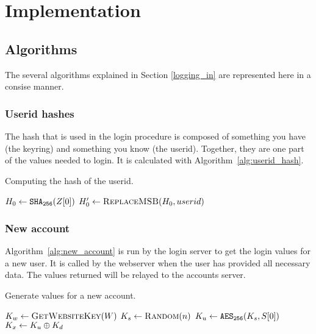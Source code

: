 \clearpage
\section{Implementation}

\subsection{Algorithms}
The several algorithms explained in Section \ref{logging_in} are represented here in a consise manner.
\subsubsection{Userid hashes}
The hash that is used in the login procedure is composed of something you have
(the keyring)
and something you know
(the userid).
Together,
they are one part of the values needed to login.
It is calculated with Algorithm~\vref{alg:userid_hash}.
\begin{algorithm}
\caption{Computing the hash of the userid.}
\label{alg:userid_hash}
\begin{algorithmic}[1]
\State $H_0\gets\texttt{\ensuremath{\mathtt{SHA_{256}}}}(Z[0])$
\State $H_0'\gets\Call{ReplaceMSB}{H_0,userid}$
\State {}
\EndProcedure
\end{algorithmic}
\end{algorithm}
\subsubsection{New account}
Algorithm~\vref{alg:new_account} is run by the login server to get the login values for a new user.
It is called by the webserver when the user has provided all necessary data.
The values returned will be relayed to the accounts server.
\begin{algorithm}
\caption{Generate values for a new account.}
\label{alg:new_account}
\begin{algorithmic}[1]
\State $K_w\gets\Call{GetWebsiteKey}{W}$	
\State $K_s\gets\Call{Random}{n}$
\State $K_u\gets\texttt{\ensuremath{\mathtt{AES_{256}}}}(K_s,S[0])$ 
\State $K_x\gets K_u\oplus K_d$ 
\State {} 
\EndProcedure
\end{algorithmic}
\end{algorithm}
\par
